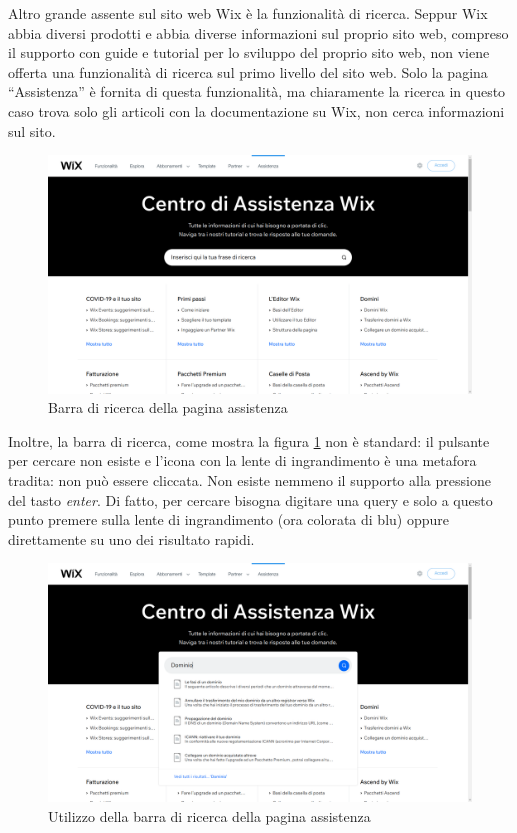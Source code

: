 \documentclass[11pt,a4paper]{article}
\newcommand*{\wix}{Wix}
\begin{document}
Altro grande assente sul sito web \wix{} è la funzionalità di
ricerca. Seppur \wix{} abbia diversi prodotti e abbia diverse
informazioni sul proprio sito web, compreso il supporto con guide e
tutorial per lo sviluppo del proprio sito web, non viene offerta una
funzionalità di ricerca sul primo livello del sito web. Solo la pagina
``Assistenza'' è fornita di questa funzionalità, ma chiaramente la
ricerca in questo caso trova solo gli articoli con la documentazione
su \wix{}, non cerca informazioni sul sito.

\begin{figure}[H]
  \centering
  \includegraphics[width=1\textwidth]{img/search-bar.png}
  \caption{Barra di ricerca della pagina assistenza}
  \label{fig:search-bar}
\end{figure}

Inoltre, la barra di ricerca, come mostra la figura
\ref{fig:search-bar} non è standard: il pulsante per cercare non
esiste e l'icona con la lente di ingrandimento è una metafora tradita:
non può essere cliccata. Non esiste nemmeno il supporto alla pressione
del tasto \textit{enter}. Di fatto, per cercare bisogna digitare una
query e solo a questo punto premere sulla lente di ingrandimento (ora
colorata di blu) oppure direttamente su uno dei risultato rapidi.

\begin{figure}[H]
  \centering
  \includegraphics[width=1\textwidth]{img/search-bar-results.png}
  \caption{Utilizzo della barra di ricerca della pagina assistenza}
  \label{fig:search-bar-results}
\end{figure}
\end{document}
